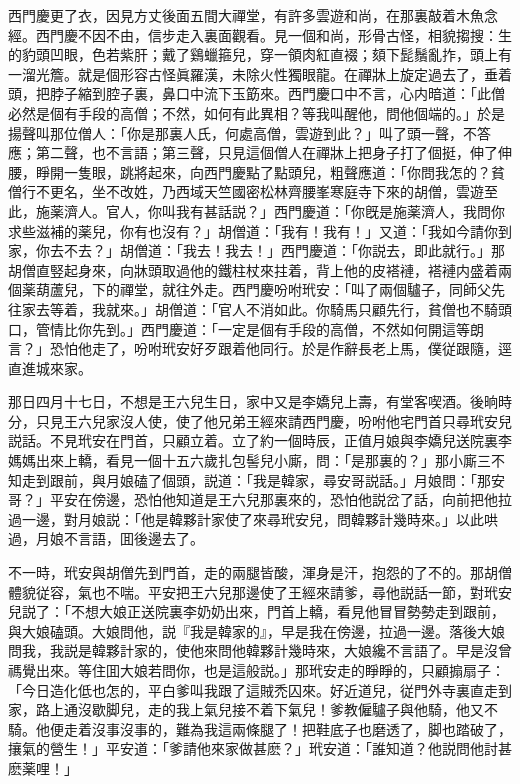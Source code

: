 西門慶更了衣，因見方丈後面五間大禪堂，有許多雲遊和尚，在那裏敲着木魚念經。西門慶不因不由，信步走入裏面觀看。見一個和尚，形骨古怪，相貌搊搜：生的豹頭凹眼，色若紫肝；戴了鷄蠟箍兒，穿一領肉紅直裰；頦下髭鬚亂拃，頭上有一溜光簷。就是個形容古怪眞羅漢，未除火性獨眼龍。在禪牀上旋定過去了，垂着頭，把脖子縮到腔子裏，鼻口中流下玉筯來。西門慶口中不言，心内暗道：「此僧必然是個有手段的高僧；不然，如何有此異相？等我叫醒他，問他個端的。」於是揚聲叫那位僧人：「你是那裏人氏，何處高僧，雲遊到此？」叫了頭一聲，不答應；第二聲，也不言語；第三聲，只見這個僧人在禪牀上把身子打了個挺，伸了伸腰，睜開一隻眼，跳將起來，向西門慶點了點頭兒，粗聲應道：「你問我怎的？貧僧行不更名，坐不改姓，乃西域天竺國密松林齊腰峯寒庭寺下來的胡僧，雲遊至此，施薬濟人。官人，你叫我有甚話説？」西門慶道：「你旣是施薬濟人，我問你求些滋補的薬兒，你有也沒有？」胡僧道：「我有！我有！」又道：「我如今請你到家，你去不去？」胡僧道：「我去！我去！」西門慶道：「你説去，即此就行。」那胡僧直竪起身來，向牀頭取過他的鐵柱杖來拄着，背上他的皮褡褳，褡褳内盛着兩個薬葫蘆兒，下的禪堂，就往外走。西門慶吩咐玳安：「叫了兩個驢子，同師父先往家去等着，我就來。」胡僧道：「官人不消如此。你騎馬只顧先行，貧僧也不騎頭口，管情比你先到。」西門慶道：「一定是個有手段的高僧，不然如何開這等朗言？」恐怕他走了，吩咐玳安好歹跟着他同行。於是作辭長老上馬，僕従跟隨，逕直進城來家。

那日四月十七日，不想是王六兒生日，家中又是李嬌兒上壽，有堂客喫酒。後晌時分，只見王六兒家沒人使，使了他兄弟王經來請西門慶，吩咐他宅門首只尋玳安兒説話。不見玳安在門首，只顧立着。立了約一個時辰，正值月娘與李嬌兒送院裏李媽媽出來上轎，看見一個十五六歲扎包髻兒小廝，問：「是那裏的？」那小廝三不知走到跟前，與月娘磕了個頭，説道：「我是韓家，尋安哥説話。」月娘問：「那安哥？」平安在傍邊，恐怕他知道是王六兒那裏來的，恐怕他説岔了話，向前把他拉過一邊，對月娘説：「他是韓夥計家使了來尋玳安兒，問韓夥計幾時來。」以此哄過，月娘不言語，囬後邊去了。

不一時，玳安與胡僧先到門首，走的兩腿皆酸，渾身是汗，抱怨的了不的。那胡僧體貌従容，氣也不喘。平安把王六兒那邊使了王經來請爹，尋他説話一節，對玳安兒説了：「不想大娘正送院裏李奶奶出來，門首上轎，看見他冒冒勢勢走到跟前，與大娘磕頭。大娘問他，説『我是韓家的』，早是我在傍邊，拉過一邊。落後大娘問我，我説是韓夥計家的，使他來問他韓夥計幾時來，大娘纔不言語了。早是沒曾禡覺出來。等住囬大娘若問你，也是這般説。」那玳安走的睜睜的，只顧搧扇子：「今日造化低也怎的，平白爹叫我跟了這賊禿囚來。好近道兒，従門外寺裏直走到家，路上通沒歇脚兒，走的我上氣兒接不着下氣兒！爹教僱驢子與他騎，他又不騎。他便走着沒事沒事的，難為我這兩條腿了！把鞋底子也磨透了，脚也踏破了，攘氣的營生！」平安道：「爹請他來家做甚麽？」玳安道：「誰知道？他説問他討甚麽薬哩！」

